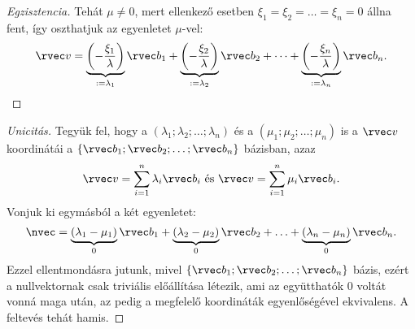 \begin{statement}
\begin{proof}[Egzisztencia]
    Tehát $\mu \neq 0$, mert ellenkező esetben $\xi_1 = \xi_2
      = \ldots = \xi_n = 0$ állna fent, így oszthatjuk az egyenletet
    $\mu$-vel:
    $$
      \rvec v
      = \underbrace{\left(-\frac{\xi_1}{\lambda}\right)}_{:= \lambda_1} \rvec b_1
      + \underbrace{\left(-\frac{\xi_2}{\lambda}\right)}_{:= \lambda_2} \rvec b_2
      + \dots
      + \underbrace{\left(-\frac{\xi_n}{\lambda}\right)}_{:= \lambda_n} \rvec b_n
      \text.
    $$
  \end{proof}

  \begin{proof}[Unicitás]
    Tegyük fel, hogy a $(\lambda_1; \lambda_2; \ldots; \lambda_n)$ és a
    $(\mu_1; \mu_2; \ldots; \mu_n)$ is a $\rvec v$
    koordinátái a $\{ \rvec b_1; \rvec b_2; \ldots; \rvec b_n \}$
    bázisban, azaz
    $$
      \rvec v = \sum_{i=1}^n \lambda_i \rvec b_i
      \text{ és }
      \rvec v = \sum_{i=1}^n \mu_i \rvec b_i
      \text.
    $$
    Vonjuk ki egymásból a két egyenletet:
    $$
      \nvec
      = \underbrace{(\lambda_1 - \mu_1)}_{0} \rvec b_1
      + \underbrace{(\lambda_2 - \mu_2)}_{0} \rvec b_2
      + \ldots
      + \underbrace{(\lambda_n - \mu_n)}_{0} \rvec b_n
      \text.
    $$
    Ezzel ellentmondásra jutunk, mivel $\{ \rvec b_1; \rvec b_2;
      \ldots; \rvec b_n \}$ bázis, ezért a nullvektornak csak triviális
    előállítása létezik, ami az együtthatók 0 voltát vonná maga után,
    az pedig a megfelelő koordináták egyenlőségével ekvivalens. A
    feltevés tehát hamis.
  \end{proof}
\end{statement}